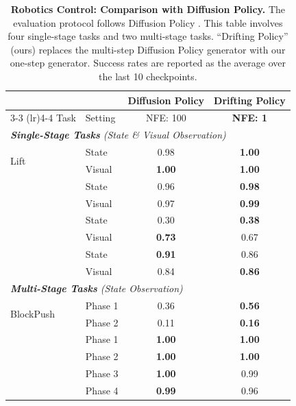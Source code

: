 \documentclass{article}
\newcommand{\tablestyle}[2]{\setlength{\tabcolsep}{#1}\renewcommand{\arraystretch}{#2}\centering
\small
}
\newcommand\tablefontsize{%
  \fontsize{8pt}{9pt}\selectfont
}
\theoremstyle{plain}
\theoremstyle{definition}
\theoremstyle{remark}
\begin{document}
\begin{table}[t]
    \centering
    \caption{\textbf{Robotics Control: Comparison with Diffusion Policy.}
    The evaluation protocol follows Diffusion Policy \citep{chi2025diffusion}.
    This table involves four single-stage tasks and two multi-stage tasks.
    ``Drifting Policy'' (ours) replaces the multi-step Diffusion Policy generator with our one-step generator.
    Success rates are reported as the average over the last 10 checkpoints.
    }
    \label{tab:robotics_combined}
    \tablestyle{4pt}{1.0}
    \scriptsize
        \begin{tabular}{llcc}
            \toprule
            & & \multicolumn{1}{c}{{Diffusion Policy}} & \multicolumn{1}{c}{\textbf{Drifting Policy}} \\
            \cmidrule(lr){3-3} \cmidrule(lr){4-4}
            Task & Setting & \multicolumn{1}{c}{{NFE: 100}} & \multicolumn{1}{c}{\textbf{NFE: 1}} \\
            \midrule
            \multicolumn{4}{l}{\textit{\textbf{Single-Stage Tasks} (State \& Visual Observation)}} \\
            \midrule
            \multirow{2}{*}{Lift} & State & {0.98} & \textbf{1.00} \\
             & Visual & {\textbf{1.00}} & \textbf{1.00} \\
            \addlinespace[0.3em]
            \multirow{2}{*}{Can} & State & {0.96} & \textbf{0.98} \\
             & Visual & {0.97} & \textbf{0.99} \\
            \addlinespace[0.3em]
            \multirow{2}{*}{ToolHang} & State & {0.30} & \textbf{0.38} \\
             & Visual & {\textbf{0.73}} & 0.67 \\
            \addlinespace[0.3em]
            \multirow{2}{*}{PushT} & State & {\textbf{0.91}} & 0.86 \\
             & Visual & {0.84} & \textbf{0.86} \\

            \midrule
            \multicolumn{4}{l}{\textit{\textbf{Multi-Stage Tasks} (State Observation)}} \\
            \midrule
            \multirow{2}{*}{BlockPush} & Phase 1 & {0.36} & \textbf{0.56} \\
             & Phase 2 & {0.11} & \textbf{0.16} \\
            \addlinespace[0.3em]
            \multirow{4}{*}{Kitchen} & Phase 1 & {\textbf{1.00}} & \textbf{1.00} \\
             & Phase 2 & {\textbf{1.00}} & \textbf{1.00} \\
             & Phase 3 & {\textbf{1.00}} & 0.99 \\
             & Phase 4 & {\textbf{0.99}} & 0.96 \\
            \bottomrule
        \end{tabular}
        \vspace{-0.5em}
\end{table}
\end{document}
